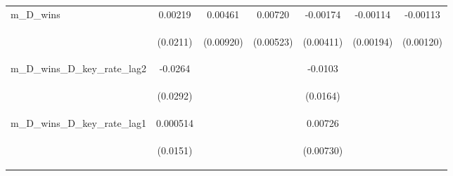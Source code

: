 \documentclass[]{article}
\begin{document}
\begin{center}
\begin{tabular}{lcccccc}
m\_D\_wins & 0.00219 & 0.00461 & 0.00720 & -0.00174 & -0.00114 & -0.00113 \\
\vspace{4pt} & \begin{footnotesize}(0.0211)\end{footnotesize} & \begin{footnotesize}(0.00920)\end{footnotesize} & \begin{footnotesize}(0.00523)\end{footnotesize} & \begin{footnotesize}(0.00411)\end{footnotesize} & \begin{footnotesize}(0.00194)\end{footnotesize} & \begin{footnotesize}(0.00120)\end{footnotesize} \\
m\_D\_wins\_D\_key\_rate\_lag2 & -0.0264 &  &  & -0.0103 &  &  \\
\vspace{4pt} & \begin{footnotesize}(0.0292)\end{footnotesize} & \begin{footnotesize}\end{footnotesize} & \begin{footnotesize}\end{footnotesize} & \begin{footnotesize}(0.0164)\end{footnotesize} & \begin{footnotesize}\end{footnotesize} & \begin{footnotesize}\end{footnotesize} \\
m\_D\_wins\_D\_key\_rate\_lag1 & 0.000514 &  &  & 0.00726 &  &  \\
\vspace{4pt} & \begin{footnotesize}(0.0151)\end{footnotesize} & \begin{footnotesize}\end{footnotesize} & \begin{footnotesize}\end{footnotesize} & \begin{footnotesize}(0.00730)\end{footnotesize} & \begin{footnotesize}\end{footnotesize} & \begin{footnotesize}\end{footnotesize} \\

\end{tabular}
\end{center}
\end{document}
